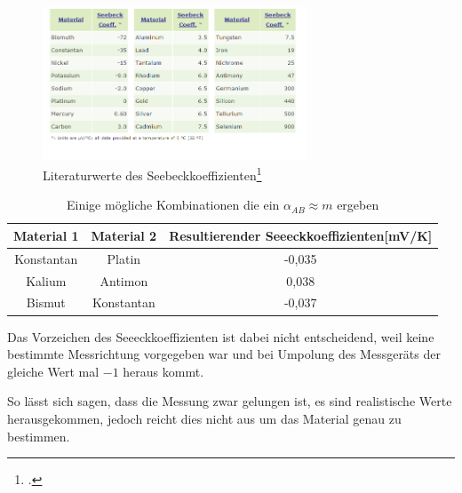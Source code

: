 \begin{figure}[htbp] 
  \centering
	\includegraphics[width=0.7\textwidth]{Seebeckkof.png}
	\caption{Literaturwerte des Seebeckkoeffizienten\footcite{Seebecklit}}
  \label{fig:Seebecklit}
\end{figure}
\begin{table}[H]
  \centering
  \begin{tabular}{c | c | c}
    Material 1 & Material 2 & Resultierender Seeeckkoeffizienten[mV/K]\\ \hline
    Konstantan  & Platin & -0,035\\
    Kalium & Antimon & 0,038\\
    Bismut & Konstantan & -0,037
  \end{tabular}
  \caption{Einige mögliche Kombinationen die ein $\alpha_{AB}\approx m$ ergeben}
  \label{tab:thermobeispiele}
\end{table}
Das Vorzeichen des Seeeckkoeffizienten ist dabei nicht entscheidend, weil keine bestimmte Messrichtung vorgegeben war und bei Umpolung des Messgeräts der gleiche Wert mal $-1$ heraus kommt.

So lässt sich sagen, dass die Messung zwar gelungen ist, es sind realistische Werte herausgekommen, jedoch reicht dies nicht aus um das Material genau zu bestimmen.

